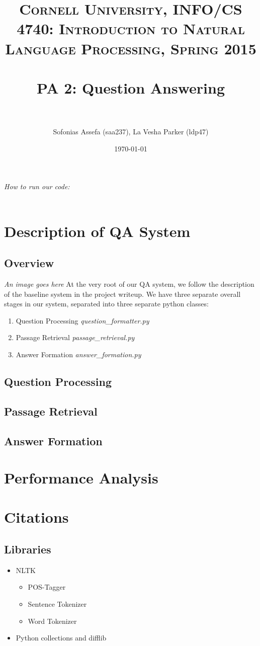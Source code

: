 \documentclass{article} %
\title{	
\normalfont \normalsize 
\textsc{Cornell University, INFO/CS 4740: Introduction to Natural Language Processing, Spring 2015} \\
\horrule{0.5pt} \\[0.4cm] %
\huge PA 2: Question Answering \\ %
\horrule{2pt} \\[0.5cm] %
}
\author{Sofonias Assefa (saa237), La Vesha Parker (ldp47)}
\date{\normalsize\today} %
\begin{document}
\maketitle %

\textit{How to run our code:\\
}\\
\section{Description of QA System}
\subsection*{Overview}
\textit{An image goes here}
At the very root of our QA system, we follow the description of the baseline system in the project writeup. We have three separate overall stages in our system, separated into three separate python classes:
\begin{enumerate}
\item Question Processing \textit{question\_formatter.py}
\item Passage Retrieval \textit{passage\_retrieval.py}
\item Answer Formation \textit{answer\_formation.py}
\end{enumerate}

\subsection{Question Processing}
\subsection{Passage Retrieval}
\subsection{Answer Formation}

\section{Performance Analysis}

\section{Citations}
\subsection{Libraries}
\begin{itemize}
\item NLTK
	\begin{itemize}
	\item POS-Tagger
	\item Sentence Tokenizer
	\item Word Tokenizer
	\end{itemize}
\item Python collections and difflib
\end{itemize}
\end{document}
